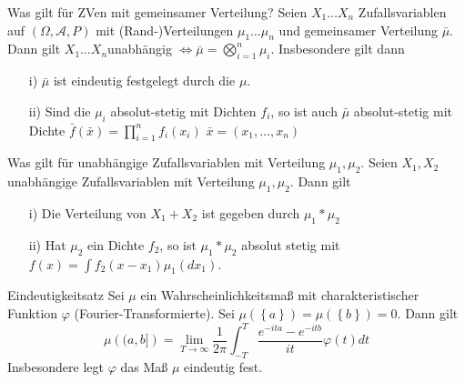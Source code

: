 \documentclass[avery5371,grid,frame]{flashcards} %
\newcommand{\1}{ \mathbb{1} } %
\begin{document}
\begin{flashcard}[Satz]{Was gilt für ZVen mit gemeinsamer Verteilung?}
  Seien $X_{1}\ldots X_{n}$ Zufallsvariablen auf $\left(\Omega,\mathcal{A},P\right)$
  mit (Rand-)Verteilungen $\mu_{1}\ldots\mu_{n}$ und gemeinsamer Verteilung
  $\bar{\mu}$. Dann gilt $X_{1}\ldots X_{n}$unabhängig $\Leftrightarrow\bar{\mu}=\bigotimes_{i=1}^{n}\mu_{i}$.
  Insbesondere gilt dann
  \begin{itemize}
  \item [{i)}] $\bar{\mu}$ ist eindeutig festgelegt durch die $\mu$. 
  \item [{ii)}] Sind die $\mu_{i}$ absolut-stetig mit Dichten $f_{i}$,
    so ist auch $\bar{\mu}$ absolut-stetig mit Dichte
      $\bar{f}\left(\bar{x}\right)  =  \prod_{i=1}^{n}f_{i}\left(x_{i}\right)$
      $\bar{x}  =  \left(x_{1},\ldots,x_{n}\right)$
  \end{itemize}
\end{flashcard}

\begin{flashcard}[Satz]{Was gilt für unabhängige Zufallsvariablen mit Verteilung $\mu_{1},\mu_{2}$.}
  Seien $X_{1},X_{2}$ unabhängige Zufallsvariablen mit Verteilung $\mu_{1},\mu_{2}$.
  Dann gilt
  \begin{itemize}
  \item [{i)}] Die Verteilung von $X_{1}+X_{2}$ ist gegeben durch $\mu_{1}*\mu_{2}$
  \item [{ii)}] Hat $\mu_{2}$ ein Dichte $f_{2}$, so ist $\mu_{1}*\mu_{2}$
    absolut stetig mit $f\left(x\right)=\int f_{2}\left(x-x_{1}\right)\mu_{1}\left(dx_{1}\right)$. 
  \end{itemize}
\end{flashcard}

\begin{flashcard}[Satz]{Eindeutigkeitsatz}
  Sei $\mu$ ein Wahrscheinlichkeitsmaß mit charakteristischer Funktion
  $\varphi$ (Fourier-Transformierte). Sei $\mu\left(\left\{ a\right\} \right)=\mu\left(\left\{ b\right\} \right)=0$.
  Dann gilt
  \[
  \mu\left((a,b]\right)=\lim_{T\to\infty}\frac{1}{2\pi}\int_{-T}^{T}\frac{e^{-ita}-e^{-itb}}{it}\varphi\left(t\right)dt
  \]
  Insbesondere legt $\varphi$ das Maß $\mu$ eindeutig fest. 
\end{flashcard}
\end{document}
